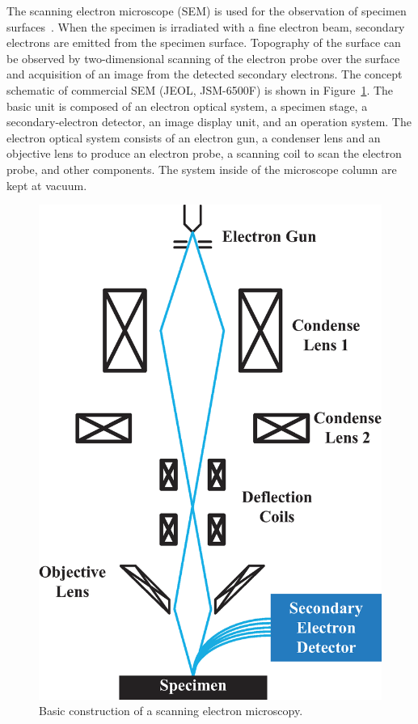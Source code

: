 The scanning electron microscope (SEM) is used for the observation of specimen surfaces~\cite{von1938elektronen}. When the specimen is irradiated with a fine electron beam, secondary electrons are emitted from the specimen surface. Topography of the surface can be observed by two-dimensional scanning of the electron probe over the surface and acquisition of an image from the detected secondary electrons. The concept schematic of commercial SEM (JEOL, JSM-6500F) is shown in Figure~\ref{fig:sem1}. The basic unit is composed of an electron optical system, a specimen stage, a secondary-electron detector, an image display unit, and an operation system. The electron optical system consists of an electron gun, a condenser lens and an objective lens to produce an electron probe, a scanning coil to scan the electron probe, and other components. The system inside of the microscope column are kept at vacuum.
\begin{figure}[htb]
\centering
\includegraphics[scale=0.5]{EXP/SEM.eps}
\caption{\label{fig:sem1}Basic construction of a scanning electron microscopy.}
\end{figure}


